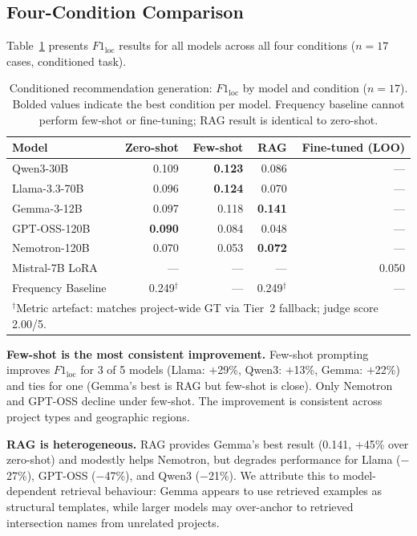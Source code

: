 \documentclass[preprint,12pt]{elsarticle}
\begin{document}
\subsection{Four-Condition Comparison}

Table~\ref{tab:main_results} presents $F1_\text{loc}$ results for all
models across all four conditions ($n = 17$ cases, conditioned task).

\begin{table}[h]
\centering
\caption{Conditioned recommendation generation: $F1_\text{loc}$ by model and condition ($n = 17$).
Bolded values indicate the best condition per model.
Frequency baseline cannot perform few-shot or fine-tuning; RAG result is identical to zero-shot.}
\label{tab:main_results}
\begin{tabular}{lrrrr}
\toprule
Model & Zero-shot & Few-shot & RAG & Fine-tuned (LOO) \\
\midrule
Qwen3-30B          & 0.109 & \textbf{0.123} & 0.086 & --- \\
Llama-3.3-70B      & 0.096 & \textbf{0.124} & 0.070 & --- \\
Gemma-3-12B        & 0.097 & 0.118 & \textbf{0.141} & --- \\
GPT-OSS-120B       & \textbf{0.090} & 0.084 & 0.048 & --- \\
Nemotron-120B      & 0.070 & 0.053 & \textbf{0.072} & --- \\
Mistral-7B LoRA    & --- & --- & --- & 0.050 \\
Frequency Baseline & 0.249$^\dagger$ & --- & 0.249$^\dagger$ & --- \\
\midrule
\multicolumn{5}{l}{$^\dagger$Metric artefact: matches project-wide GT via Tier~2 fallback; judge score 2.00/5.} \\
\bottomrule
\end{tabular}
\end{table}

\textbf{Few-shot is the most consistent improvement.}
Few-shot prompting improves $F1_\text{loc}$ for 3 of 5 models
(Llama: $+$29\%, Qwen3: $+$13\%, Gemma: $+$22\%)
and ties for one (Gemma's best is RAG but few-shot is close).
Only Nemotron and GPT-OSS decline under few-shot.
The improvement is consistent across project types and geographic regions.

\textbf{RAG is heterogeneous.}
RAG provides Gemma's best result (0.141, $+$45\% over zero-shot)
and modestly helps Nemotron, but degrades performance for Llama ($-$27\%),
GPT-OSS ($-$47\%), and Qwen3 ($-$21\%).
We attribute this to model-dependent retrieval behaviour: Gemma appears
to use retrieved examples as structural templates, while larger models
may over-anchor to retrieved intersection names from unrelated projects.
\end{document}
